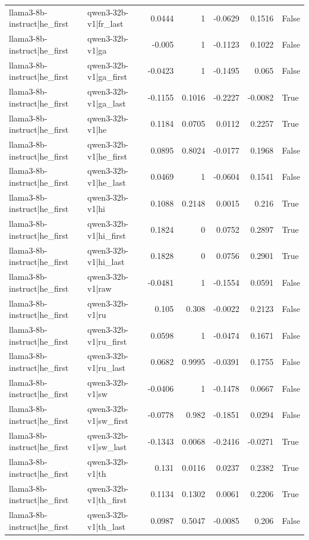 \begin{table}
\begin{tabular}{l l r r r r l}
llama3-8b-instruct|he_first & qwen3-32b-v1|fr_last & 0.0444 & 1 & -0.0629 & 0.1516 & False \\
llama3-8b-instruct|he_first & qwen3-32b-v1|ga & -0.005 & 1 & -0.1123 & 0.1022 & False \\
llama3-8b-instruct|he_first & qwen3-32b-v1|ga_first & -0.0423 & 1 & -0.1495 & 0.065 & False \\
llama3-8b-instruct|he_first & qwen3-32b-v1|ga_last & -0.1155 & 0.1016 & -0.2227 & -0.0082 & True \\
llama3-8b-instruct|he_first & qwen3-32b-v1|he & 0.1184 & 0.0705 & 0.0112 & 0.2257 & True \\
llama3-8b-instruct|he_first & qwen3-32b-v1|he_first & 0.0895 & 0.8024 & -0.0177 & 0.1968 & False \\
llama3-8b-instruct|he_first & qwen3-32b-v1|he_last & 0.0469 & 1 & -0.0604 & 0.1541 & False \\
llama3-8b-instruct|he_first & qwen3-32b-v1|hi & 0.1088 & 0.2148 & 0.0015 & 0.216 & True \\
llama3-8b-instruct|he_first & qwen3-32b-v1|hi_first & 0.1824 & 0 & 0.0752 & 0.2897 & True \\
llama3-8b-instruct|he_first & qwen3-32b-v1|hi_last & 0.1828 & 0 & 0.0756 & 0.2901 & True \\
llama3-8b-instruct|he_first & qwen3-32b-v1|raw & -0.0481 & 1 & -0.1554 & 0.0591 & False \\
llama3-8b-instruct|he_first & qwen3-32b-v1|ru & 0.105 & 0.308 & -0.0022 & 0.2123 & False \\
llama3-8b-instruct|he_first & qwen3-32b-v1|ru_first & 0.0598 & 1 & -0.0474 & 0.1671 & False \\
llama3-8b-instruct|he_first & qwen3-32b-v1|ru_last & 0.0682 & 0.9995 & -0.0391 & 0.1755 & False \\
llama3-8b-instruct|he_first & qwen3-32b-v1|sw & -0.0406 & 1 & -0.1478 & 0.0667 & False \\
llama3-8b-instruct|he_first & qwen3-32b-v1|sw_first & -0.0778 & 0.982 & -0.1851 & 0.0294 & False \\
llama3-8b-instruct|he_first & qwen3-32b-v1|sw_last & -0.1343 & 0.0068 & -0.2416 & -0.0271 & True \\
llama3-8b-instruct|he_first & qwen3-32b-v1|th & 0.131 & 0.0116 & 0.0237 & 0.2382 & True \\
llama3-8b-instruct|he_first & qwen3-32b-v1|th_first & 0.1134 & 0.1302 & 0.0061 & 0.2206 & True \\
llama3-8b-instruct|he_first & qwen3-32b-v1|th_last & 0.0987 & 0.5047 & -0.0085 & 0.206 & False \\

\end{tabular}
\end{table}
